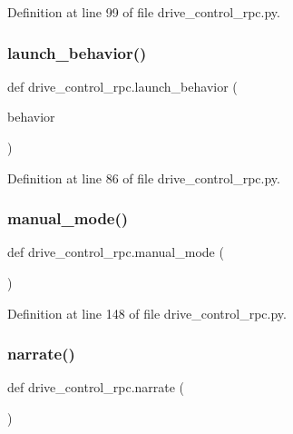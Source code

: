 Definition at line 99 of file drive\+\_\+control\+\_\+rpc.\+py.

\mbox{\label{namespacedrive__control__rpc_aae666e8d207e9e50bf7129f0c2271874}} 
\subsubsection{\texorpdfstring{launch\+\_\+behavior()}{launch\_behavior()}}
{\footnotesize\ttfamily def drive\+\_\+control\+\_\+rpc.\+launch\+\_\+behavior (\begin{DoxyParamCaption}\item[{}]{behavior }\end{DoxyParamCaption})}



Definition at line 86 of file drive\+\_\+control\+\_\+rpc.\+py.

\mbox{\label{namespacedrive__control__rpc_ae223cba1fab85e14b18fcd496a95bd34}} 
\subsubsection{\texorpdfstring{manual\+\_\+mode()}{manual\_mode()}}
{\footnotesize\ttfamily def drive\+\_\+control\+\_\+rpc.\+manual\+\_\+mode (\begin{DoxyParamCaption}{ }\end{DoxyParamCaption})}



Definition at line 148 of file drive\+\_\+control\+\_\+rpc.\+py.

\mbox{\label{namespacedrive__control__rpc_a5f11fca03a0e794d62e61ec5cf1d890c}} 
\subsubsection{\texorpdfstring{narrate()}{narrate()}}
{\footnotesize\ttfamily def drive\+\_\+control\+\_\+rpc.\+narrate (\begin{DoxyParamCaption}{ }\end{DoxyParamCaption})}




